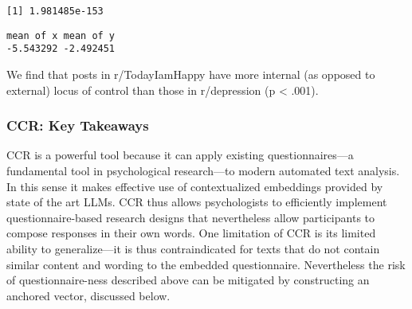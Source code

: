 \documentclass[
  man,
  floatsintext,
  longtable,
  nolmodern,
  notxfonts,
  notimes,
  colorlinks=true,linkcolor=blue,citecolor=blue,urlcolor=blue]{apa7}
\newenvironment{Shaded}{\begin{snugshade}}{\end{snugshade}}
\newcommand{\AttributeTok}[1]{\textcolor[rgb]{0.40,0.45,0.13}{#1}}
\newcommand{\CommentTok}[1]{\textcolor[rgb]{0.37,0.37,0.37}{#1}}
\newcommand{\FunctionTok}[1]{\textcolor[rgb]{0.28,0.35,0.67}{#1}}
\newcommand{\NormalTok}[1]{\textcolor[rgb]{0.00,0.23,0.31}{#1}}
\newcommand{\OtherTok}[1]{\textcolor[rgb]{0.00,0.23,0.31}{#1}}
\newcommand{\SpecialCharTok}[1]{\textcolor[rgb]{0.37,0.37,0.37}{#1}}
\newcommand{\StringTok}[1]{\textcolor[rgb]{0.13,0.47,0.30}{#1}}
\begin{document}
\begin{Shaded}
\end{Shaded}

\begin{verbatim}
[1] 1.981485e-153
\end{verbatim}

\begin{Shaded}
\end{Shaded}

\begin{verbatim}
mean of x mean of y 
-5.543292 -2.492451 
\end{verbatim}

We find that posts in r/TodayIamHappy have more internal (as opposed to
external) locus of control than those in r/depression (p \textless{}
.001).

\subsubsection{CCR: Key Takeaways}\label{ccr-key-takeaways}

CCR is a powerful tool because it can apply existing questionnaires---a
fundamental tool in psychological research---to modern automated text
analysis. In this sense it makes effective use of contextualized
embeddings provided by state of the art LLMs. CCR thus allows
psychologists to efficiently implement questionnaire-based research
designs that nevertheless allow participants to compose responses in
their own words. One limitation of CCR is its limited ability to
generalize---it is thus contraindicated for texts that do not contain
similar content and wording to the embedded questionnaire. Nevertheless
the risk of questionnaire-ness described above can be mitigated by
constructing an anchored vector, discussed below.
\end{document}
